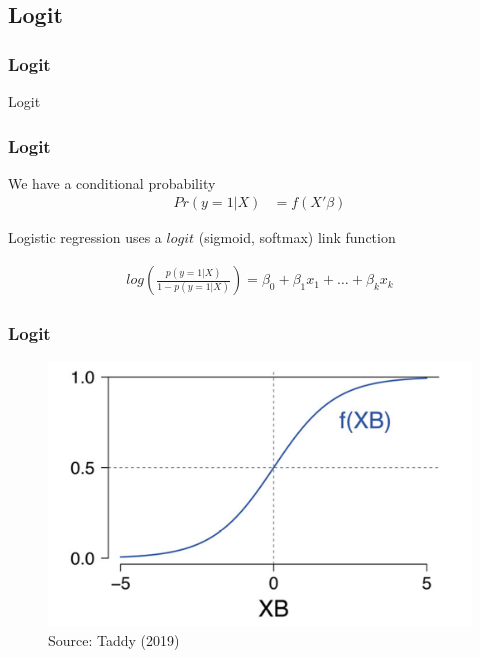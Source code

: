 \documentclass[
  shownotes,
  xcolor={svgnames},
  hyperref={colorlinks,citecolor=DarkBlue,linkcolor=DarkRed,urlcolor=DarkBlue}
  , aspectratio=169]{beamer}
\begin{document}
\subsection{Logit}
\begin{frame}[fragile]
\frametitle{Logit}


\centering
{\huge \textcolor{andesred}{Logit}}



\end{frame}
\begin{frame}[fragile]
\frametitle{Logit}
We have a conditional probability
\begin{align}
Pr(y=1|X) &= f(X'\beta) 
\end{align}

Logistic regression uses a $logit$ (sigmoid, softmax) link function

\begin{align}
log \left(\frac{p(y=1|X)}{1-p(y=1|X)}\right)=\beta_0 +\beta_1 x_1 + \dots +\beta_k x_k
\end{align}

\end{frame}
\begin{frame}[fragile]
\frametitle{Logit}



        \begin{figure}[H] \centering
            \captionsetup{justification=centering}
              \includegraphics[scale=0.2]{figures/logistic}
              \\
              \tiny
              Source: Taddy (2019)
 \end{figure}

\end{frame}
\end{document}
